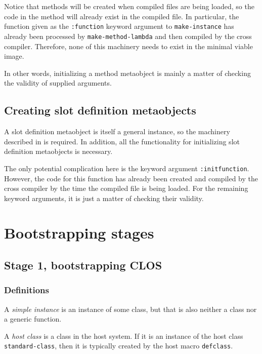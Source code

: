 Notice that methods will be created when compiled files are being
loaded, so the code in the method will already exist in the compiled
file.  In particular, the function given as the \texttt{:function}
keyword argument to \texttt{make-instance} has already been processed
by \texttt{make-method-lambda} and then compiled by the cross
compiler.  Therefore, none of this machinery needs to exist in the
minimal viable image.

In other words, initializing a method metaobject is mainly a matter of
checking the validity of supplied arguments.

\subsection{Creating slot definition metaobjects}

A slot definition metaobject is itself a general instance, so the
machinery described in
 is required.  In
addition, all the functionality for initializing slot definition
metaobjects is necessary.

The only potential complication here is the keyword argument
\texttt{:initfunction}.  However, the code for this function has
already been created and compiled by the cross compiler by the time
the compiled file is being loaded.  For the remaining keyword
arguments, it is just a matter of checking their validity.

\section{Bootstrapping stages}

\subsection{Stage 1, bootstrapping CLOS}

\subsubsection{Definitions}

\begin{definition}
A \emph{simple instance} is an instance of some class, but that is
also neither a class nor a generic function.
\end{definition}

\begin{definition}
A \emph{host class} is a class in the host system.  If it is an
instance of the host class \texttt{standard-class}, then it is
typically created by the host macro \texttt{defclass}.
\end{definition}

